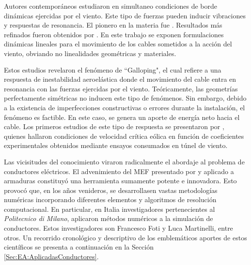 Autores contemporáneos estudiaron en simultaneo condiciones de borde dinámicas ejercidas por el viento. Este tipo de fuerzas pueden inducir vibraciones y respuestas de resonancia. El pionero en la materia fue \cite{Davenport1965}. Resultados más refinados fueron obtenidos por \cite{Starossek1991}. En este trabajo se exponen formulaciones dinámicas lineales para el movimiento de los cables sometidos a la acción del viento, obviando no linealidades geométricas y materiales. 

Estos estudios revelaron el fenómeno de ``Galloping", el cual refiere a una respuesta de inestabilidad aeroelástica donde el movimiento del cable entra en resonancia con las fuerzas ejercidas por el viento. Teóricamente, las geometrías perfectamente simétricas no inducen este tipo de fenómenos. Sin embargo, debido a la existencia de imperfecciones constructivas o errores durante la instalación, el fenómeno es factible. En este caso, se genera un aporte de energía neto hacia el cable. Los primeros estudios de este tipo de respuesta se presentaron por \cite{Simiu1986}, quienes hallaron condiciones de velocidad crítica eólica en función de coeficientes experimentales obtenidos mediante ensayos consumados en túnel de viento. 

Las vicisitudes del conocimiento viraron radicalmente el abordaje al problema de conductores eléctricos. El advenimiento del \gls{MEF} presentado por \cite{zienkiewicz1970finite} y aplicado a armaduras constituyó una herramienta sumamente potente e innovadora. Esto provocó que, en los años venideros, se desarrollasen vastas metodologías numéricas incorporando diferentes elementos y algoritmos de resolución computacional. En particular, en Italia investigadores pertenecientes al \emph{Politecnico di Milano}, aplicaron métodos numéricos a la simulación de conductores. Estos investigadores son Francesco Foti y Luca Martinelli, entre otros. Un recorrido cronológico y descriptivo de los emblemáticos aportes de estos científicos se presenta a continuación en la Sección \ref{Sec:EA:AplicadasConductores}.

